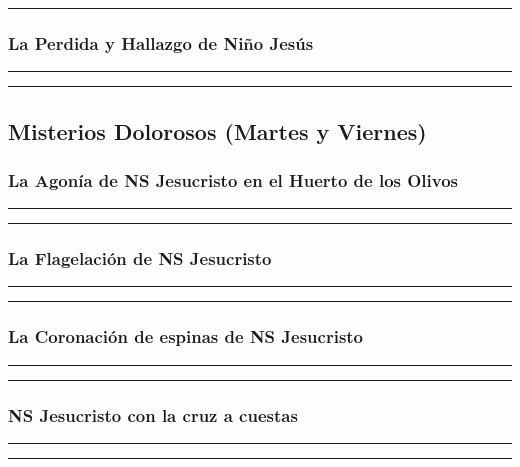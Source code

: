 \documentclass[11pt,a4paper]{report}
\begin{document}
\rule{\textwidth}{0.5pt}


\subsubsection*{La Perdida y Hallazgo de Niño Jesús}


\rule{\textwidth}{0.5pt}

\rule{\textwidth}{0.5pt}


\subsection*{Misterios Dolorosos (Martes y Viernes)}
\subsubsection*{La Agonía de NS Jesucristo en el Huerto de los Olivos}


\rule{\textwidth}{0.5pt}

\rule{\textwidth}{0.5pt}


\subsubsection*{La Flagelación de NS Jesucristo}


\rule{\textwidth}{0.5pt}

\rule{\textwidth}{0.5pt}


\subsubsection*{La Coronación de espinas de NS Jesucristo}


\rule{\textwidth}{0.5pt}

\rule{\textwidth}{0.5pt}


\subsubsection*{NS Jesucristo con la cruz a cuestas}


\rule{\textwidth}{0.5pt}

\rule{\textwidth}{0.5pt}

\end{document}
